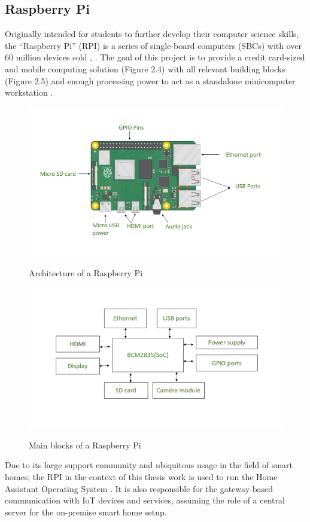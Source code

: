 \subsection{Raspberry Pi}
Originally intended for students to further develop their computer science skills, the “Raspberry Pi” (RPI) is a series of single-board computers (SBCs) with over 60 million devices sold \cite{raspberrypi_wiki}, \cite{raspberrypi_cnn}. The goal of this project is to provide a credit card-sized and mobile computing solution (Figure 2.4) with all relevant building blocks (Figure 2.5) and enough processing power to act as a standalone minicomputer workstation \cite{rpi_arch}.\\
\begin{figure}[H]
\centering
\begin{minipage}{.5\textwidth}
  \centering
  \includegraphics[width=0.7\linewidth]{Images/rasberrypi.png}
  \caption{Architecture of a Raspberry Pi}
  \label{fig:RPI_Arch}
  \cite{rpi_arch}
\end{minipage}%
\begin{minipage}{.5\textwidth}
  \centering
  \includegraphics[width=0.8\linewidth]{Images/rasberrypi1.png}
  \caption{Main blocks of a Raspberry Pi}
  \label{fig:RPI_blocks}
  \cite{rpi_arch}
\end{minipage}
\end{figure}

Due to its large support community and ubiquitous usage in the field of smart homes, the RPI in the context of this thesis work is used to run the Home Assistant Operating System \cite{ha_os}. It is also responsible for the gateway-based communication with IoT devices and services, assuming the role of a central server for the on-premise smart home setup.


